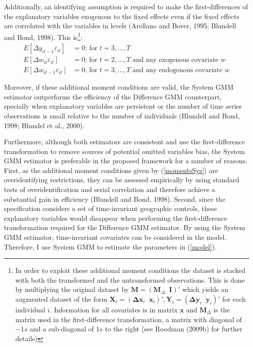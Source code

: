 \documentclass[a4paper, 12pt]{article}
\begin{document}
Additionally, an identifying assumption is required to make the first-differences of the explanatory variables exogenous to the fixed effects even if the fixed effects are correlated with the variables in levels (Arellano and Bover, 1995; Blundell and Bond, 1998). This is\footnote{In order to exploit these additional moment conditions the dataset is stacked with both the transformed and the untransformed observations. This is done by multiplying the original dataset by $\mathbf{M}=\left(\mathbf{M}_{\Delta}\;\;\mathbf{I}\right)'$ which yields an augmented dataset of the form $\mathbf{X}_{i}=\left(\mathbf{\Delta x}_{i}\;\;\mathbf{x}_i\right)', \mathbf{Y}_{i}=\left(\mathbf{\Delta y}_{i}\;\;\mathbf{y}_i\right)'$ for each individual $i$. Information for all covariates is in matrix $\mathbf{x}$ and $\mathbf{M}_{\Delta}$ is the matrix used in the first-difference transformation, a matrix with diagonal of $-1s$ and a sub-diagonal of $1s$ to the right (see Roodman (2009b) for further details)}:
\begin{equation}
\label{momentsSys}
\begin{aligned}
E\left[\Delta y_{it-1}\varepsilon_{it}\right]&=0 \text{; for $t=3,...,T$}\\
E\left[\Delta w_{it}\varepsilon_{it}\right]&=0 \text{; for $t=2,...,T$ and any exogenous covariate $w$}\\
E\left[\Delta w_{it-1}\varepsilon_{it}\right]&=0 \text{; for $t=3,...,T$ and any endogenous covariate $w$}
\end{aligned}
\end{equation}

Moreover, if these additional moment conditions are valid, the System GMM estimator outperforms the efficiency of the Difference GMM counterpart, specially when explanatory variables are persistent or the number of time series observations is small relative to the number of individuals (Blundell and Bond, 1998; Blundel et al., 2000). 

Furthermore, although both estimators are consistent and use the first-difference transformation to remove sources of potential omitted variables bias, the System GMM estimator is preferable in the proposed framework for a number of reasons. First, as the additional moment conditions given by (\ref{momentsSys}) are overidentifying restrictions, they can be assessed empirically by using standard tests of overidentification and serial correlation and therefore achieve a substantial gain in efficiency (Blundell and Bond, 1998). Second, since the specification considers a set of time-invariant geographic controls, these explanatory variables would disappear when performing the first-difference transformation required for the Difference GMM estimator. By using the System GMM estimator, time-invariant covariates can be considered in the model. Therefore, I use System GMM to estimate the parameters in (\ref{model}).
\end{document}
